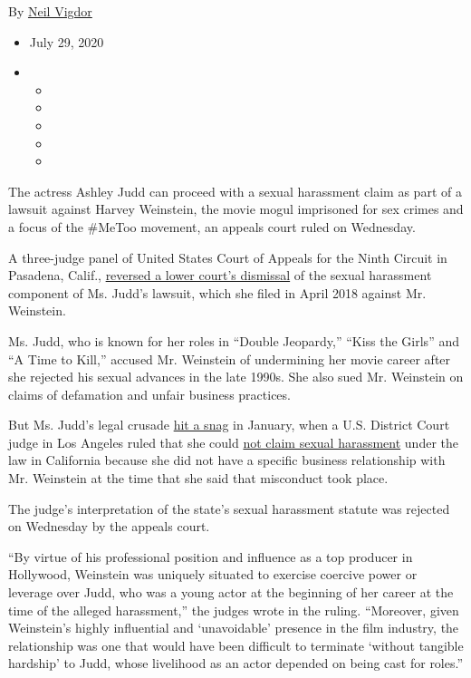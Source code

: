By \href{https://www.nytimes3xbfgragh.onion/by/neil-vigdor}{Neil Vigdor}

\begin{itemize}
\item
  July 29, 2020
\item
  \begin{itemize}
  \item
  \item
  \item
  \item
  \item
  \end{itemize}
\end{itemize}

The actress Ashley Judd can proceed with a sexual harassment claim as
part of a lawsuit against Harvey Weinstein, the movie mogul imprisoned
for sex crimes and a focus of the \#MeToo movement, an appeals court
ruled on Wednesday.

A three-judge panel of United States Court of Appeals for the Ninth
Circuit in Pasadena, Calif.,
\href{https://cdn.ca9.uscourts.gov/datastore/opinions/2020/07/29/19-55499.pdf}{reversed
a lower court's dismissal} of the sexual harassment component of Ms.
Judd's lawsuit, which she filed in April 2018 against Mr. Weinstein.

Ms. Judd, who is known for her roles in ``Double Jeopardy,'' ``Kiss the
Girls'' and ``A Time to Kill,'' accused Mr. Weinstein of undermining her
movie career after she rejected his sexual advances in the late 1990s.
She also sued Mr. Weinstein on claims of defamation and unfair business
practices.

But Ms. Judd's legal crusade
\href{https://www.nytimes3xbfgragh.onion/2019/01/09/business/media/ashley-judd-lawsuit-harvey-weinstein.html}{hit
a snag} in January, when a U.S. District Court judge in Los Angeles
ruled that she could
\href{https://www.hollywoodreporter.com/thr-esq/judge-lets-ashley-judd-sue-harvey-weinstein-defamation-not-sexual-harassment-1145409}{not
claim sexual harassment} under the law in California because she did not
have a specific business relationship with Mr. Weinstein at the time
that she said that misconduct took place.

The judge's interpretation of the state's sexual harassment statute was
rejected on Wednesday by the appeals court.

``By virtue of his professional position and influence as a top producer
in Hollywood, Weinstein was uniquely situated to exercise coercive power
or leverage over Judd, who was a young actor at the beginning of her
career at the time of the alleged harassment,'' the judges wrote in the
ruling. ``Moreover, given Weinstein's highly influential and
`unavoidable' presence in the film industry, the relationship was one
that would have been difficult to terminate `without tangible hardship'
to Judd, whose livelihood as an actor depended on being cast for
roles.''

